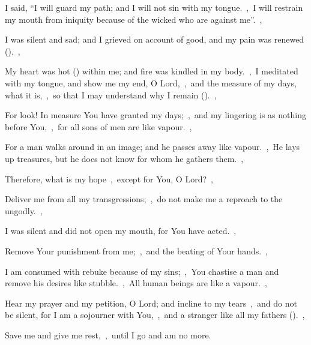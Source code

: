 \documentclass[12pt,twoside,a5paper]{article}
\begin{document}
\begin{normalparskip}
  I said, ``I will guard my path; and I will not sin with my tongue.~\sep\ I will restrain my mouth from iniquity because of the wicked who are against me''.~\sep


  I was silent and sad; and I grieved on account of good, and my pain was renewed ().~\sep

  My heart was hot () within me; and fire was kindled in my body.~\sep\ I meditated with my tongue, and show me my end, O Lord,~\sep\ and the measure of my days, what it is,~\sep\ so that I may understand why I remain ().~\sep

  For look! In measure You have granted my days;~\sep\ and my lingering is as nothing before You,~\sep\ for all sons of men are like vapour.~\sep

  For a man walks around in an image; and he passes away like vapour.~\sep\ He lays up treasures, but he does not know for whom he gathers them.~\sep

  Therefore, what is my hope~\sep\ except for You, O Lord?~\sep

  Deliver me from all my transgressions;~\sep\ do not make me a reproach to the ungodly.~\sep

  I was silent and did not open my mouth, for You have acted.~\sep

  Remove Your punishment from me;~\sep\ and the beating of Your hands.~\sep

  I am consumed with rebuke because of my sins;~\sep\ You chastise a man and remove his desires like stubble.~\sep\ All human beings are like a vapour.~\sep

  Hear my prayer and my petition, O Lord; and incline to my tears~\sep\ and do not be silent, for I am a sojourner with You,~\sep\ and a stranger like all my fathers ().~\sep

  Save me and give me rest,~\sep\ until I go and am no more.
\end{normalparskip}

\end{document}
